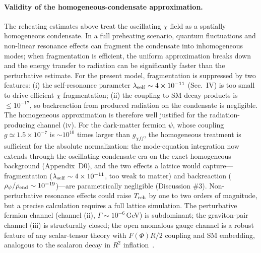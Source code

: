 \documentclass[pdflatex,sn-mathphys-num]{sn-jnl}
\theoremstyle{thmstyleone}
\begin{document}
\paragraph{Validity of the homogeneous-condensate approximation.} The reheating estimates above treat the oscillating $\chi$ field as a spatially homogeneous condensate. In a full preheating scenario, quantum fluctuations and non-linear resonance effects can fragment the condensate into inhomogeneous modes; when fragmentation is efficient, the uniform approximation breaks down and the energy transfer to radiation can be significantly faster than the perturbative estimate. For the present model, fragmentation is suppressed by two features: (i) the self-resonance parameter $\lambda_{\rm self}\sim4\times10^{-11}$ (Sec.~IV) is too small to drive efficient $\chi$ fragmentation; (ii) the coupling to SM decay products is $\leq10^{-17}$, so backreaction from produced radiation on the condensate is negligible. The homogeneous approximation is therefore well justified for the radiation-producing channel (iv). For the dark-matter fermion $\psi$, whose coupling $g\simeq1.5\times10^{-7}$ is $\sim10^{10}$ times larger than $g_{\chi ff}$, the homogeneous treatment is sufficient for the absolute normalization: the mode-equation integration now extends through the oscillating-condensate era on the exact homogeneous background (Appendix~D0), and the two effects a lattice would capture---fragmentation ($\lambda_{\rm self}\sim4\times10^{-11}$, too weak to matter) and backreaction ($\rho_\psi/\rho_{\rm end}\sim10^{-19}$)---are parametrically negligible (Discussion \#3). Non-perturbative resonance effects could raise $T_{\rm reh}$ by one to two orders of magnitude, but a precise calculation requires a full lattice simulation. The perturbative fermion channel (channel (ii), $\Gamma\sim10^{-6}\,$GeV) is subdominant; the graviton-pair channel (iii) is structurally closed; the open anomalous gauge channel is a robust feature of any scalar-tensor theory with $F(\Phi)R/2$ coupling and SM embedding, analogous to the scalaron decay in $R^2$ inflation~\cite{Starobinsky1980}.
\end{document}
